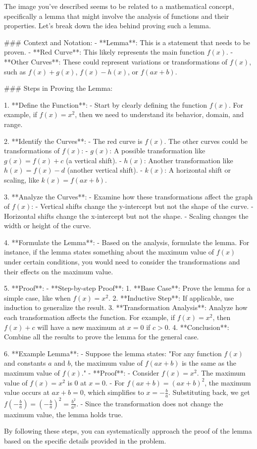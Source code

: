 The image you've described seems to be related to a mathematical concept, specifically a lemma that might involve the analysis of functions and their properties. Let's break down the idea behind proving such a lemma.

### Context and Notation:
- **Lemma**: This is a statement that needs to be proven.
- **Red Curve**: This likely represents the main function \( f(x) \).
- **Other Curves**: These could represent variations or transformations of \( f(x) \), such as \( f(x) + g(x) \), \( f(x) - h(x) \), or \( f(ax + b) \).

### Steps in Proving the Lemma:

1. **Define the Function**:
   - Start by clearly defining the function \( f(x) \). For example, if \( f(x) = x^2 \), then we need to understand its behavior, domain, and range.

2. **Identify the Curves**:
   - The red curve is \( f(x) \). The other curves could be transformations of \( f(x) \):
     - \( g(x) \): A possible transformation like \( g(x) = f(x) + c \) (a vertical shift).
     - \( h(x) \): Another transformation like \( h(x) = f(x) - d \) (another vertical shift).
     - \( k(x) \): A horizontal shift or scaling, like \( k(x) = f(ax + b) \).

3. **Analyze the Curves**:
   - Examine how these transformations affect the graph of \( f(x) \):
     - Vertical shifts change the y-intercept but not the shape of the curve.
     - Horizontal shifts change the x-intercept but not the shape.
     - Scaling changes the width or height of the curve.

4. **Formulate the Lemma**:
   - Based on the analysis, formulate the lemma. For instance, if the lemma states something about the maximum value of \( f(x) \) under certain conditions, you would need to consider the transformations and their effects on the maximum value.

5. **Proof**:
   - **Step-by-step Proof**:
     1. **Base Case**: Prove the lemma for a simple case, like when \( f(x) = x^2 \).
     2. **Inductive Step**: If applicable, use induction to generalize the result.
     3. **Transformation Analysis**: Analyze how each transformation affects the function. For example, if \( f(x) = x^2 \), then \( f(x) + c \) will have a new maximum at \( x = 0 \) if \( c > 0 \).
     4. **Conclusion**: Combine all the results to prove the lemma for the general case.

6. **Example Lemma**:
   - Suppose the lemma states: "For any function \( f(x) \) and constants \( a \) and \( b \), the maximum value of \( f(ax + b) \) is the same as the maximum value of \( f(x) \)."
   - **Proof**:
     - Consider \( f(x) = x^2 \). The maximum value of \( f(x) = x^2 \) is 0 at \( x = 0 \).
     - For \( f(ax + b) = (ax + b)^2 \), the maximum value occurs at \( ax + b = 0 \), which simplifies to \( x = -\frac{b}{a} \). Substituting back, we get \( f(-\frac{b}{a}) = (-\frac{b}{a})^2 = \frac{b^2}{a^2} \).
     - Since the transformation does not change the maximum value, the lemma holds true.

By following these steps, you can systematically approach the proof of the lemma based on the specific details provided in the problem.